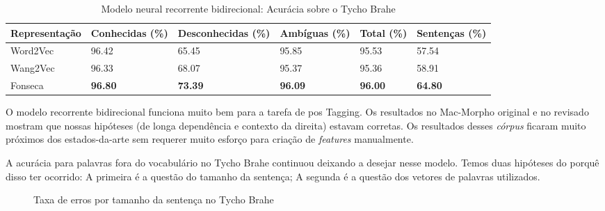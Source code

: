 \begin{table}[!htb]
\footnotesize
\centering
\caption{Modelo neural recorrente bidirecional: Acurácia sobre o Tycho Brahe}
\label{tab:acuraciatb_bidir}
\begin{tabular}{m{2.5cm}P{2.2cm}P{2.2cm}P{2.2cm}P{2.2cm}P{2.2cm}}
  \toprule
  \textbf{Representação} & \textbf{Conhecidas (\%)}  & \textbf{Desconhecidas (\%)} & \textbf{Ambíguas (\%)} & \textbf{Total (\%)} & \textbf{Sentenças (\%)} \\
  \midrule
  Word2Vec  & 96.42 & 65.45 & 95.85 & 95.53 & 57.54  \\ %
  Wang2Vec  & 96.33 & 68.07 & 95.37 & 95.36 & 58.91  \\ %
  Fonseca 	& \textbf{96.80} & \textbf{73.39} & \textbf{96.09} & \textbf{96.00} & \textbf{64.80}  \\ %
  \bottomrule
\end{tabular}
\end{table}



O modelo recorrente bidirecional funciona muito bem para a tarefa de \ac{pos} Tagging. Os resultados no Mac-Morpho original e no revisado mostram que nossas hipóteses (de longa dependência e contexto da direita) estavam corretas. Os resultados desses \textit{córpus} ficaram muito próximos dos estados-da-arte sem requerer muito esforço para criação de \textit{features} manualmente. 

A acurácia para palavras fora do vocabulário no Tycho Brahe continuou deixando a desejar nesse modelo. Temos duas hipóteses do porquê disso ter ocorrido: A primeira é a questão do tamanho da sentença; A segunda é a questão dos vetores de palavras utilizados. 


\begin{figure}[!htb]
  \caption{Taxa de erros por tamanho da sentença no Tycho Brahe}
  \label{fig:erroporsentenca}
  \begin{center}
\end{center}
\end{figure}


